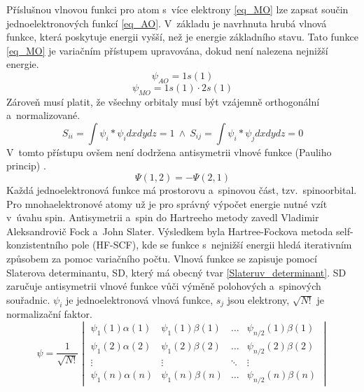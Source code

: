 \documentclass[
  printed, %
  table,   %
  lof,     %
  lot,     %
  oneside,
]{fithesis3}
\begin{document}
Příslušnou vlnovou funkci pro atom s~více elektrony \ref{eq_MO} lze zapsat součin jednoelektronových funkcí \ref{eq_AO}.  V~základu je navrhnuta hrubá vlnová funkce, která poskytuje energii vyšší, než je energie základního stavu. Tato funkce \ref{eq_MO} je variačním přístupem upravována, dokud není nalezena nejnižší energie.  
\begin{equation}
\psi_{AO} = 1s(1)
\label{eq_AO}
\end{equation}
\begin{equation}
\psi_{MO} = 1s(1) \cdot 2s(1)
\label{eq_MO}
\end{equation} 
Zároveň musí platit, že všechny orbitaly musí být vzájemně orthogonální a~normalizované.
\begin{equation}
S_{ii} = \int \psi_i * \psi_i dx dy dz = 1 ~ \wedge ~ S_{ij} = \int \psi_i * \psi_j dx dy dz = 0
\end{equation}
V~tomto přístupu ovšem není dodržena antisymetrii vlnové funkce (Pauliho princip) \cite{warren1986ab}.
\begin{equation}
\Psi (1,2) = - \Psi (2,1)
\label{Paulliho_princip}
\end{equation}
 Každá jednoelektronová funkce má prostorovu a~spinovou část, tzv.~spinoorbital. Pro mnohaelektronové atomy už je pro správný výpočet energie nutné vzít v~úvahu spin.  Antisymetrii a~spin do Hartreeho metody zavedl Vladimir Aleksandrovič Fock a~John Slater. Výsledkem byla Hartree-Fockova metoda self-konzistentního pole (HF-SCF), kde se funkce s~nejnižší energii hledá iterativním způsobem za pomoc variačního počtu. Vlnová funkce se zapisuje pomocí Slaterova determinantu, SD, který má obecný tvar \ref{Slateruv_determinant}. SD zaručuje antisymetrii vlnové funkce vůči výměně polohových a~spinových souřadnic. $\psi_i$ je jednoelektronová vlnová funkce, $s_j$ jsou elektrony, $\sqrt{N!}$ je normalizační faktor.
\begin{equation}
\psi =  \frac{1}{\sqrt{N!}}\begin{vmatrix}
\psi_1(1)\alpha(1) & \psi_1(1) \beta (1)  & \dots & \psi_{n/2}(1)\beta(1) \\
\psi_1(2)\alpha(2) & \psi_1(2) \beta (2) & \dots & \psi_{n/2}(2)\beta(2) \\
\vdots             & \vdots                           & \ddots & \vdots \\
\psi_1(n)\alpha(n) & \psi_1(n) \beta (n) & \dots & \psi_{n/2}(n)\beta(n) 
\end{vmatrix}
\label{Slateruv_determinant}
\end{equation}
\end{document}
